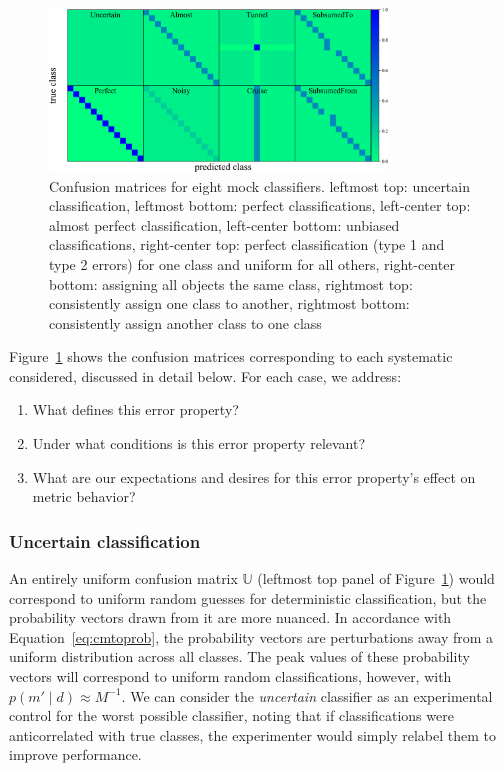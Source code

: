 
\begin{figure}
	\begin{center}
    \includegraphics[width=0.8\textwidth]{./fig/all_sim_cm.png}
		\caption{Confusion matrices for eight mock classifiers.
    leftmost top: uncertain classification,
    leftmost bottom: perfect classifications,
    left-center top: almost perfect classification,
    left-center bottom: unbiased classifications,
    right-center top: perfect classification (type 1 and type 2 errors) for one class and uniform for all others,
    right-center bottom: assigning all objects the same class,
    rightmost top: consistently assign one class to another,
    rightmost bottom: consistently assign another class to one class}
		\label{fig:mock_cm}
	\end{center}
\end{figure}

Figure~\ref{fig:mock_cm} shows the confusion matrices corresponding to each systematic considered, discussed in detail below.
For each case, we address:
\begin{enumerate}
  \item What defines this error property?
  \item Under what conditions is this error property relevant?
  \item What are our expectations and desires for this error property's effect on metric behavior?
\end{enumerate}

\subsubsection{Uncertain classification}
\label{sec:uncertaindata}

An entirely uniform confusion matrix $\mathbb{U}$ (leftmost top panel of Figure~\ref{fig:mock_cm}) would correspond to uniform random guesses for deterministic classification, but the probability vectors drawn from it are more nuanced.
In accordance with Equation~\ref{eq:cmtoprob}, the probability vectors are perturbations away from a uniform distribution across all classes.
The peak values of these probability vectors will correspond to uniform random classifications, however, with $p(m' \mid d)\approx M^{-1}$.
We can consider the \textit{uncertain} classifier as an experimental control for the worst possible classifier, noting that if classifications were anticorrelated with true classes, the experimenter would simply relabel them to improve performance.


